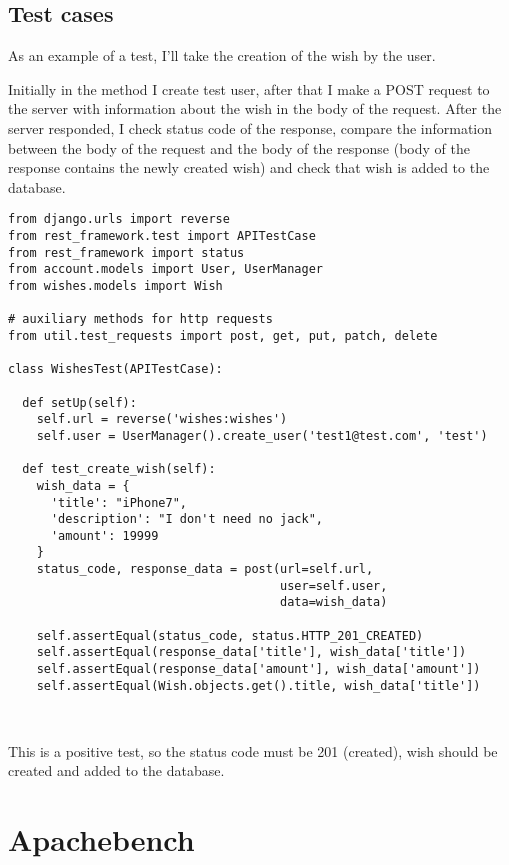 \subsection{Test cases}
As an example of a test, I'll take the creation of the wish by the user.

Initially in the method  I create test user, after that I make a POST request to the server with
information about the wish in the body of the request. After the server responded, I check status code of the response,
compare the information between the body of the request and the body of the response (body of the response contains
the newly created wish) and check that wish is added to the database.

\begin{lstlisting}
from django.urls import reverse
from rest_framework.test import APITestCase
from rest_framework import status
from account.models import User, UserManager
from wishes.models import Wish

# auxiliary methods for http requests
from util.test_requests import post, get, put, patch, delete

class WishesTest(APITestCase):

  def setUp(self):
    self.url = reverse('wishes:wishes')
    self.user = UserManager().create_user('test1@test.com', 'test')

  def test_create_wish(self):
    wish_data = {
      'title': "iPhone7",
      'description': "I don't need no jack",
      'amount': 19999
    }
    status_code, response_data = post(url=self.url,
                                      user=self.user,
                                      data=wish_data)

    self.assertEqual(status_code, status.HTTP_201_CREATED)
    self.assertEqual(response_data['title'], wish_data['title'])
    self.assertEqual(response_data['amount'], wish_data['amount'])
    self.assertEqual(Wish.objects.get().title, wish_data['title'])



\end{lstlisting}

This is a positive test, so the status code must be 201 (created), wish should be created and added to the database.


\section{Apachebench}

